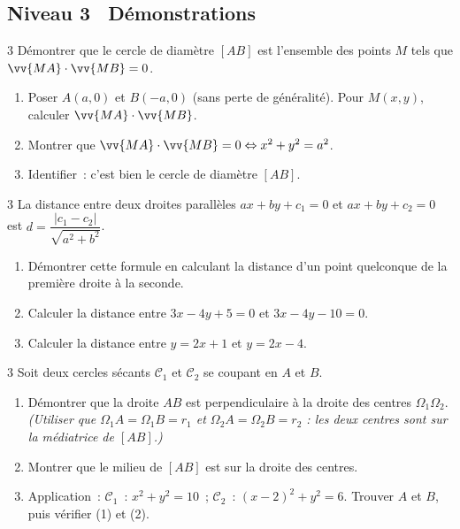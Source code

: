 \subsection*{\quad Niveau 3 \textemdash\ D\'emonstrations}

\begin{exo}{3}
D\'emontrer que le cercle de diam\`etre $[AB]$ est l'ensemble des
points $M$ tels que $\vv{MA}\cdot\vv{MB}=0$.
\begin{enumerate}
  \item Poser $A(a,0)$ et $B(-a,0)$ (sans perte de g\'en\'eralit\'e).
        Pour $M(x,y)$, calculer $\vv{MA}\cdot\vv{MB}$.
  \item Montrer que $\vv{MA}\cdot\vv{MB}=0 \Leftrightarrow x^2+y^2=a^2$.
  \item Identifier~: c'est bien le cercle de diam\`etre $[AB]$.
\end{enumerate}
\end{exo}

\begin{exo}{3}
La distance entre deux droites parall\`eles $ax+by+c_1=0$ et $ax+by+c_2=0$
est $d = \dfrac{|c_1-c_2|}{\sqrt{a^2+b^2}}$.
\begin{enumerate}
  \item D\'emontrer cette formule en calculant la distance d'un point
        quelconque de la premi\`ere droite \`a la seconde.
  \item Calculer la distance entre $3x-4y+5=0$ et $3x-4y-10=0$.
  \item Calculer la distance entre $y=2x+1$ et $y=2x-4$.
\end{enumerate}
\end{exo}

\begin{exo}{3}
Soit deux cercles s\'ecants $\mathcal{C}_1$ et $\mathcal{C}_2$ se coupant
en $A$ et $B$.
\begin{enumerate}
  \item D\'emontrer que la droite $AB$ est perpendiculaire \`a la droite
        des centres $\Omega_1\Omega_2$.
        \emph{(Utiliser que $\Omega_1A=\Omega_1B=r_1$ et
        $\Omega_2A=\Omega_2B=r_2$ : les deux centres sont sur la
        m\'ediatrice de $[AB]$.)}
  \item Montrer que le milieu de $[AB]$ est sur la droite des centres.
  \item Application~: $\mathcal{C}_1$~: $x^2+y^2=10$~;
        $\mathcal{C}_2$~: $(x-2)^2+y^2=6$.
        Trouver $A$ et $B$, puis v\'erifier (1) et (2).
\end{enumerate}
\end{exo}

